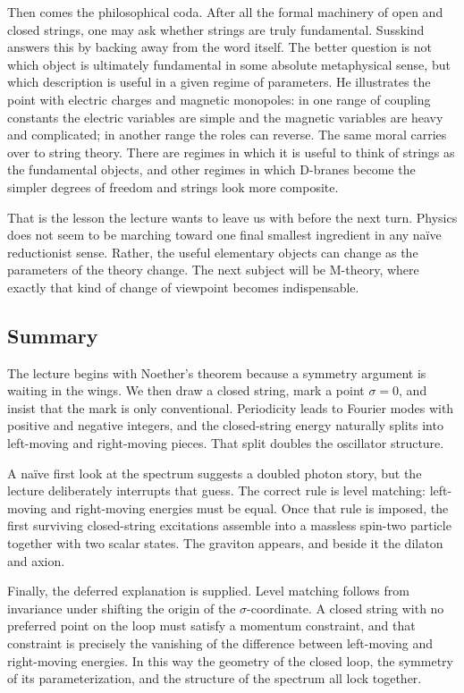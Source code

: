 Then comes the philosophical coda. After all the formal machinery of open and closed strings, one may ask whether strings are truly fundamental. Susskind answers this by backing away from the word itself. The better question is not which object is ultimately fundamental in some absolute metaphysical sense, but which description is useful in a given regime of parameters. He illustrates the point with electric charges and magnetic monopoles: in one range of coupling constants the electric variables are simple and the magnetic variables are heavy and complicated; in another range the roles can reverse. The same moral carries over to string theory. There are regimes in which it is useful to think of strings as the fundamental objects, and other regimes in which D-branes become the simpler degrees of freedom and strings look more composite.

That is the lesson the lecture wants to leave us with before the next turn. Physics does not seem to be marching toward one final smallest ingredient in any naïve reductionist sense. Rather, the useful elementary objects can change as the parameters of the theory change. The next subject will be M-theory, where exactly that kind of change of viewpoint becomes indispensable.

\subsection{Summary}

The lecture begins with Noether's theorem because a symmetry argument is waiting in the wings. We then draw a closed string, mark a point \(\sigma=0\), and insist that the mark is only conventional. Periodicity leads to Fourier modes with positive and negative integers, and the closed-string energy naturally splits into left-moving and right-moving pieces. That split doubles the oscillator structure.

A naïve first look at the spectrum suggests a doubled photon story, but the lecture deliberately interrupts that guess. The correct rule is level matching: left-moving and right-moving energies must be equal. Once that rule is imposed, the first surviving closed-string excitations assemble into a massless spin-two particle together with two scalar states. The graviton appears, and beside it the dilaton and axion.

Finally, the deferred explanation is supplied. Level matching follows from invariance under shifting the origin of the \(\sigma\)-coordinate. A closed string with no preferred point on the loop must satisfy a momentum constraint, and that constraint is precisely the vanishing of the difference between left-moving and right-moving energies. In this way the geometry of the closed loop, the symmetry of its parameterization, and the structure of the spectrum all lock together.